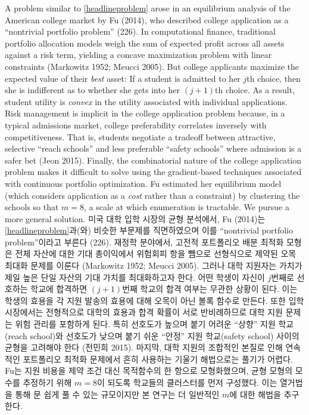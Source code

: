 \documentclass[11pt]{article} %
\theoremstyle{definition}
\theoremstyle{definition}
\begin{document}
\ifen
A problem similar to \eqref{headlineproblem} arose in an equilibrium analysis of the American college market by Fu (2014), who described college application as a ``nontrivial portfolio problem'' (226). In computational finance, traditional portfolio allocation models weigh the sum of expected profit across all assets against a risk term, yielding a concave maximization problem with linear constraints (Markowitz 1952; Meucci 2005). But college applicants maximize the expected value of their \emph{best} asset: If a student is admitted to her $j$th choice, then she is indifferent as to whether she gets into her $(j+1)$th choice. As a result, student utility is \emph{convex} in the utility associated with individual applications. Risk management is implicit in the college application problem because, in a typical admissions market, college preferability correlates inversely with competitiveness. That is, students negotiate a tradeoff between attractive, selective “reach schools” and less preferable “safety schools” where admission is a safer bet (Jeon 2015). Finally, the combinatorial nature of the college application problem makes it difficult to solve using the gradient-based techniques associated with continuous portfolio optimization. Fu estimated her equilibrium model (which considers application as a \emph{cost} rather than a constraint) by clustering the schools so that $m=8$, a scale at which enumeration is tractable. We pursue a more general solution.
\else
미국 대학 입학 시장의 균형 분석에서, Fu (2014)는 \eqref{headlineproblem}과(와) 비슷한 부문제를 직면하였으며 이를 ``nontrivial portfolio problem''이라고 부른다 (226). 재정학 분야에서, 고전적 포트폴리오 배분 최적화 모형은 전체 자산에 대한 기대 총이익에서 위험회피 항을 뺌으로 선형식으로 제약된 오목 최대화 문제를 이룬다 (Markowitz 1952; Meucci 2005). 그러나 대학 지원자는 가치가 제일 높은 단일 자산의 기대 가치를 최대화하고자 한다. 어떤 학생이 자신이 $j$번째로 선호하는 학교에 합격하면 $(j+1)$번째 학교의 합격 여부는 무관한 상황이 된다. 이는 학생의 효용을 각 지원 발송의 효용에 대해 오목이 아닌 볼록 함수로 만든다. 또한 입학 시장에서는 전형적으로 대학의 효용과 합격 확률이 서로 반비례하므로 대학 지원 문제는 위험 관리를 포함하게 된다. 특히 선호도가 높으며 붙기 어려운 “상향” 지원 학교(reach school)와 선호도가 낮으며 붙기 쉬운 “안정” 지원 학교(safety school) 사이의 균형을 고려해야 한다 (전민희 2015). 마지막, 대학 지원의 조합적인 본질로 인해 연속적인 포트폴리오 최적화 문제에서 흔히 사용하는 기울기 해법으로는 풀기가 어렵다. Fu는 지원 비용을 제약 조건 대신 목적함수의 한 항으로 모형화했으며, 균형 모형의 모수를 추정하기 위해 $m=8$이 되도록 학교들의 클러스터를 먼저 구성했다. 이는 열거법을 통해 문 쉽게 풀 수 있는 규모이지만 본 연구는 더 일반적인 $m$에 대한 해법을 추구한다.
\fi
\end{document}
